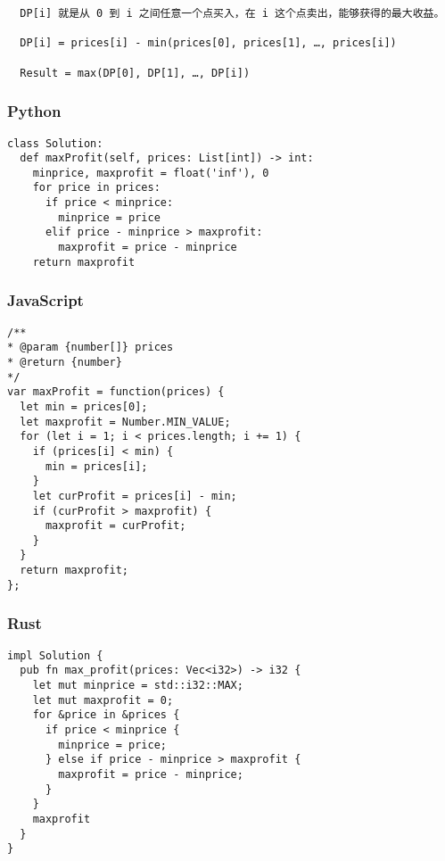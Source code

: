 \begin{verbatim}
  DP[i] 就是从 0 到 i 之间任意一个点买入，在 i 这个点卖出，能够获得的最大收益。

  DP[i] = prices[i] - min(prices[0], prices[1], …, prices[i])

  Result = max(DP[0], DP[1], …, DP[i])
\end{verbatim}

\subsubsection{Python}

\begin{verbatim}
class Solution:
  def maxProfit(self, prices: List[int]) -> int:
    minprice, maxprofit = float('inf'), 0
    for price in prices:
      if price < minprice:
        minprice = price
      elif price - minprice > maxprofit:
        maxprofit = price - minprice
    return maxprofit
\end{verbatim}

\subsubsection{JavaScript}

\begin{verbatim}
/**
* @param {number[]} prices
* @return {number}
*/
var maxProfit = function(prices) {
  let min = prices[0];
  let maxprofit = Number.MIN_VALUE;
  for (let i = 1; i < prices.length; i += 1) {
    if (prices[i] < min) {
      min = prices[i];
    }
    let curProfit = prices[i] - min;
    if (curProfit > maxprofit) {
      maxprofit = curProfit;
    }
  }
  return maxprofit;
};
\end{verbatim}

\subsubsection{Rust}

\begin{verbatim}
impl Solution {
  pub fn max_profit(prices: Vec<i32>) -> i32 {
    let mut minprice = std::i32::MAX;
    let mut maxprofit = 0;
    for &price in &prices {
      if price < minprice {
        minprice = price;
      } else if price - minprice > maxprofit {
        maxprofit = price - minprice;
      }
    }
    maxprofit
  }
}
\end{verbatim}
